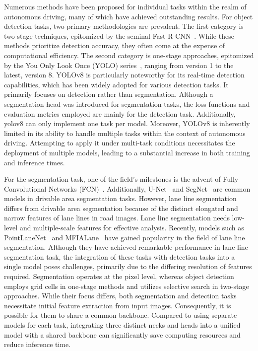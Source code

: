 \documentclass[lettersize,journal]{IEEEtran}
\begin{document}
Numerous methods have been proposed for individual tasks within the realm of autonomous driving, many of which have achieved outstanding results. For object detection tasks, two primary methodologies are prevalent. The first category is two-stage techniques, epitomized by the seminal Fast R-CNN~\cite{girshick2015fast}. While these methods prioritize detection accuracy, they often come at the expense of computational efficiency. The second category is one-stage approaches, epitomized by the You Only Look Once (YOLO) series~\cite{redmon2016you,redmon2017yolo9000,redmon2018yolov3,wang2023yolov7}, ranging from version 1 to the latest, version 8. YOLOv8 is particularly noteworthy for its real-time detection capabilities, which has been widely adopted for various detection tasks. It primarily focuses on detection rather than segmentation. Although a segmentation head was introduced for segmentation tasks, the loss functions and evaluation metrics employed are mainly for the detection task. Additionally, yolov8 can only implement one task per model. Moreover, YOLOv8 is inherently limited in its ability to handle multiple tasks within the context of autonomous driving. Attempting to apply it under multi-task conditions necessitates the deployment of multiple models, leading to a substantial increase in both training and inference times. 


For the segmentation task, one of the field's milestones is the advent of Fully Convolutional Networks (FCN)~\cite{long2015fully}. Additionally, U-Net~\cite{ronneberger2015u} and SegNet~\cite{badrinarayanan2017segnet} are common models in drivable area segmentation tasks. However, lane line segmentation differs from drivable area segmentation because of the distinct elongated and narrow features of lane lines in road images. Lane line segmentation needs low-level and multiple-scale features for effective analysis. Recently, models such as PointLaneNet~\cite{qian2019dlt} and MFIALane~\cite{qiu2022mfialane} have gained popularity in the field of lane line segmentation. Although they have achieved remarkable performance in lane line segmentation task,  the integration of these tasks with detection tasks into a single model poses challenges, primarily due to the differing resolution of features required. Segmentation operates at the pixel level, whereas object detection employs grid cells in one-stage methods and utilizes selective search in two-stage approaches. While their focus differs, both segmentation and detection tasks necessitate initial feature extraction from input images. Consequently, it is possible for them to share a common backbone. Compared to using separate models for each task, integrating three distinct necks and heads into a unified model with a shared backbone can significantly save computing resources and reduce inference time.
\end{document}
